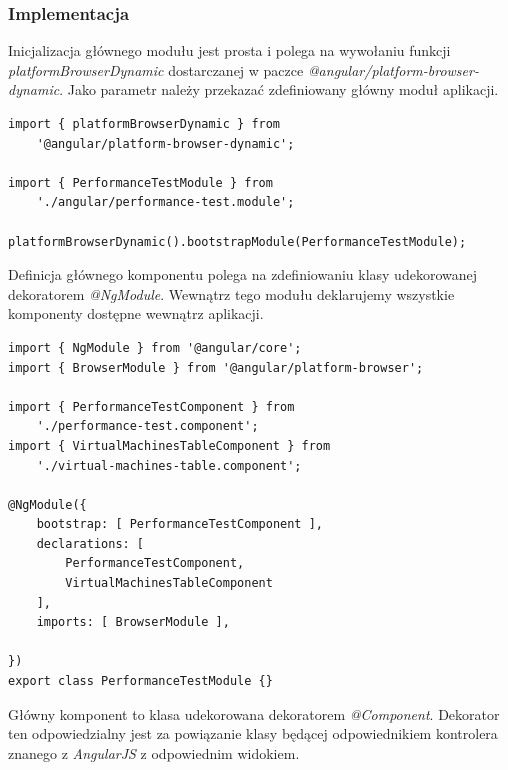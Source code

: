 \documentclass[polish, twoside, 12pt]{mwart}
\begin{document}
\subsubsection{Implementacja}

Inicjalizacja głównego modułu jest prosta i polega na wywołaniu funkcji \emph{platformBrowserDynamic} dostarczanej w paczce \emph{@angular/platform-browser-dynamic}. Jako parametr należy przekazać zdefiniowany główny moduł aplikacji.

\begin{lstlisting}[caption=Inicjalizacja głównego modułu]
import { platformBrowserDynamic } from
    '@angular/platform-browser-dynamic';

import { PerformanceTestModule } from
    './angular/performance-test.module';

platformBrowserDynamic().bootstrapModule(PerformanceTestModule);
\end{lstlisting}

Definicja głównego komponentu polega na zdefiniowaniu klasy udekorowanej dekoratorem \emph{@NgModule}. Wewnątrz tego modułu deklarujemy wszystkie komponenty dostępne wewnątrz aplikacji.

\begin{lstlisting}[caption=Główny moduł]
import { NgModule } from '@angular/core';
import { BrowserModule } from '@angular/platform-browser';

import { PerformanceTestComponent } from
    './performance-test.component';
import { VirtualMachinesTableComponent } from
    './virtual-machines-table.component';

@NgModule({
    bootstrap: [ PerformanceTestComponent ],
    declarations: [
        PerformanceTestComponent,
        VirtualMachinesTableComponent
    ],
    imports: [ BrowserModule ],

})
export class PerformanceTestModule {}
\end{lstlisting}

Główny komponent to klasa udekorowana dekoratorem \emph{@Component}. Dekorator ten odpowiedzialny jest za powiązanie klasy będącej odpowiednikiem kontrolera znanego z \emph{AngularJS} z odpowiednim widokiem.
\end{document}
